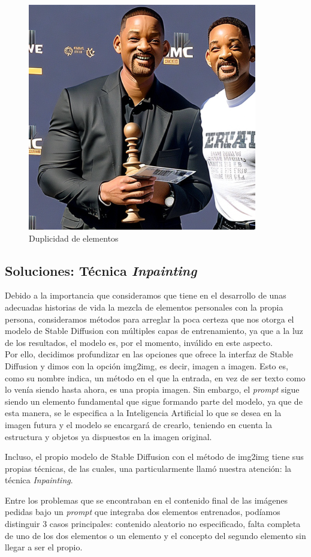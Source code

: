 \begin{figure}[h]
	\centering
	\includegraphics[width = 0.5
	\textwidth]{Imagenes/Vectorial/duplicidad_will.png}
		\caption{Duplicidad de elementos}
	\label{fig:willpor2}
\end{figure}

\subsection{Soluciones: Técnica \textit{Inpainting}}

Debido a la importancia que consideramos que tiene en el desarrollo de unas adecuadas historias de vida la mezcla de elementos personales con la propia persona, consideramos métodos para arreglar la poca certeza que nos otorga el modelo de Stable Diffusion con múltiples capas de entrenamiento, ya que a la luz de los resultados, el modelo es, por el momento, inválido en este aspecto. \\

Por ello, decidimos profundizar en las opciones que ofrece la interfaz de Stable Diffusion y dimos con la opción img2img, es decir, imagen a imagen. Esto es, como su nombre indica, un método en el que la entrada, en vez de ser texto como lo venía siendo hasta ahora, es una propia imagen. Sin embargo, el \textit{prompt} sigue siendo un elemento fundamental que sigue formando parte del modelo, ya que de esta manera, se le especifica a la Inteligencia Artificial lo que se desea en la imagen futura y el modelo se encargará de crearlo, teniendo en cuenta la estructura y objetos ya dispuestos en la imagen original. 

Incluso, el propio modelo de Stable Diffusion con el método de img2img tiene sus propias técnicas, de las cuales, una particularmente llamó nuestra atención: la técnica \textit{Inpainting}. 

Entre los problemas que se encontraban en el contenido final de las imágenes pedidas bajo un \textit{prompt} que integraba dos elementos entrenados, podíamos distinguir 3 casos principales: contenido aleatorio no especificado, falta completa de uno de los dos elementos o un elemento y el concepto del segundo elemento sin llegar a ser el propio. 

